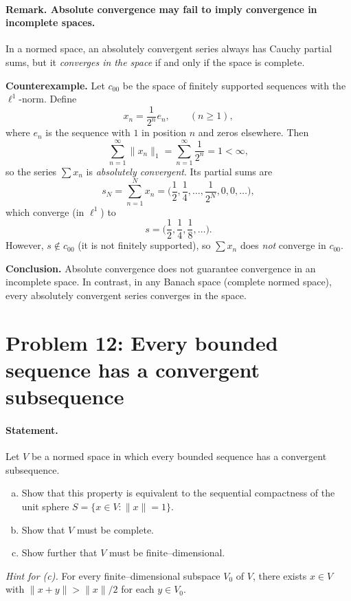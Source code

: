 \documentclass[12pt,a4paper]{article}
\theoremstyle{plain}
\theoremstyle{definition}
\theoremstyle{remark}
\theoremstyle{remark}
\begin{document}
\paragraph{Remark. Absolute convergence may fail to imply convergence in incomplete spaces.}

In a normed space, an absolutely convergent series always has Cauchy partial sums, but it
\emph{converges in the space} if and only if the space is complete.

\textbf{Counterexample.}
Let $c_{00}$ be the space of finitely supported sequences with the $\ell^{1}$-norm.
Define
\[
x_n = \frac{1}{2^{n}} e_n, \qquad (n\ge1),
\]
where $e_n$ is the sequence with $1$ in position $n$ and zeros elsewhere.
Then
\[
\sum_{n=1}^\infty \|x_n\|_1 = \sum_{n=1}^\infty \frac{1}{2^n} = 1 < \infty,
\]
so the series $\sum x_n$ is \emph{absolutely convergent}.
Its partial sums are
\[
s_N = \sum_{n=1}^N x_n = \bigg(\frac12, \frac14, \dots, \frac{1}{2^N}, 0, 0, \dots\bigg),
\]
which converge (in $\ell^1$) to
\[
s = \bigg(\frac12, \frac14, \frac18, \dots\bigg).
\]
However, $s\notin c_{00}$ (it is not finitely supported), so $\sum x_n$
does \emph{not} converge in $c_{00}$.

\textbf{Conclusion.}
Absolute convergence does not guarantee convergence in an incomplete space.
In contrast, in any Banach space (complete normed space), every absolutely
convergent series converges in the space.

\section*{Problem 12: Every bounded sequence has a convergent subsequence}

\paragraph{Statement.}
Let $V$ be a normed space in which every bounded sequence has a convergent subsequence.
\begin{enumerate}[(a)]
	\item Show that this property is equivalent to the sequential compactness of the unit sphere
	$S=\{x\in V:\|x\|=1\}$.
	\item Show that $V$ must be complete.
	\item[\textnormal{(c)$^*$}] Show further that $V$ must be finite--dimensional.
\end{enumerate}
\emph{Hint for (c).} For every finite--dimensional subspace $V_0$ of $V$, there exists $x\in V$
with $\|x+y\|>\|x\|/2$ for each $y\in V_0$.
\end{document}
